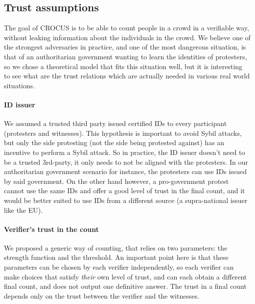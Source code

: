 \subsection{Trust assumptions}

The goal of CROCUS is to be able to count people in a crowd in a verifiable way, without leaking information about the individuals in the crowd.
We believe one of the strongest adversaries in practice, and one of the most dangerous situation, is that of an authoritarian government wanting to learn the identities of protesters,
so we chose a theoretical model that fits this situation well, but it is interesting to see what are the trust relations which are actually needed in various real world situations.

\paragraph{ID issuer} We assumed a trusted third party issued certified IDs to every participant (protesters and witnesses). This hypothesis is important to avoid Sybil attacks,
but only the side protesting (not the side being protested against) has an incentive to perform a Sybil attack.
So in practice, the ID issuer doesn't need to be a trusted 3rd-party, it only needs to not be aligned with the protesters.
In our authoritarian government scenario for instance, the protesters can use IDs issued by said government.
On the other hand however, a pro-government protest cannot use the same IDs and offer a good level of trust in the final count, and it would be better suited to use IDs from a different source
(\eg a supra-national issuer like the EU).

 \paragraph{Verifier's trust in the count} We proposed a generic way of counting, that relies on two parameters: the strength function and the threshold.
An important point here is that these parameters can be chosen by each verifier independently, so each verifier can make choices that satisfy \emph{their} own level of trust, and can each obtain a different final count, and \CROCUS does not output one definitive answer. The trust in a final count depends only on the trust between the verifier and the witnesses.

